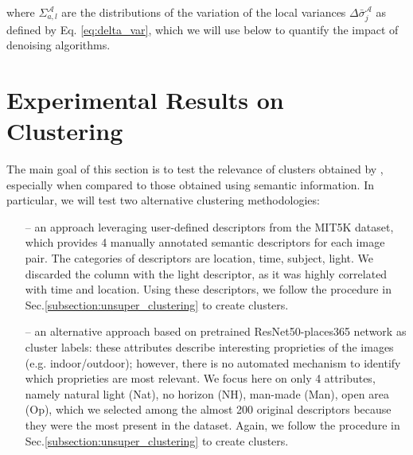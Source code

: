 \documentclass[12pt]{spieman}  %
\begin{document}
\begin{spacing}{2}
\begin{linenumbers}
where $\Sigma^{\mathcal{A}}_{a,l}$ are the distributions of the variation of the local variances $\Delta \bar{\sigma}_j^{\mathcal{A}}$ as defined by Eq. \ref{eq:delta_var}, which we will use below to quantify the impact of denoising algorithms.


\section{Experimental Results on Clustering}
\label{sec:results}
The main goal of this section is to test the relevance of clusters obtained by \clustname, especially when compared to those obtained using semantic  information. In particular, we will test two alternative clustering methodologies:
\begin{itemize}


\item[--] {an approach leveraging user-defined descriptors from the MIT5K dataset, which provides 4 manually annotated semantic descriptors for each image pair. The categories of descriptors are location, time, subject, light. We discarded the column with the light descriptor, as it was highly correlated with time and location. Using these descriptors, we follow the procedure in}  Sec.\ref{subsection:unsuper_clustering} {to create clusters.} 
\item[--] {an alternative approach based on pretrained ResNet50-places365 network} \cite{zhou2017places}  {as cluster labels: these attributes describe interesting proprieties of the images (e.g. indoor/outdoor); however, there is no automated mechanism to identify which proprieties are most relevant. We focus here on only 4 attributes, namely natural light (Nat), no horizon (NH), man-made (Man), open area (Op), which we selected among the almost 200 original descriptors because they were the most present in the dataset. Again, we follow the procedure in Sec.}\ref{subsection:unsuper_clustering}  {to create clusters.}
\end{itemize}



\end{linenumbers}
\end{spacing}
\end{document}
